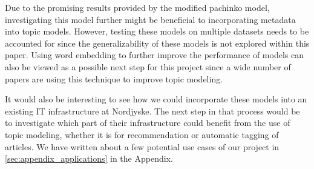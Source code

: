Due to the promising results provided by the modified pachinko model, investigating this model further might be beneficial to incorporating metadata into topic models.
However, testing these models on multiple datasets needs to be accounted for since the generalizability of these models is not explored within this paper.
Using word embedding to further improve the performance of models can also be viewed as a possible next step for this project since a wide number of papers are using this technique to improve topic modeling.

It would also be interesting to see how we could incorporate these models into an existing IT infrastructure at Nordjyske.
The next step in that process would be to investigate which part of their infrastructure could benefit from the use of topic modeling, whether it is for recommendation or automatic tagging of articles. 
We have written about a few potential use cases of our project in \ref{sec:appendix_applications} in the Appendix. 

